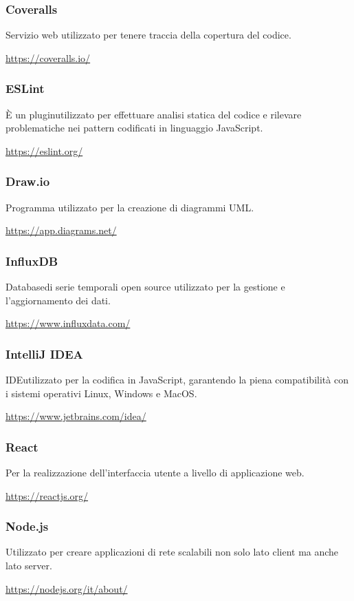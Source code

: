 	\subsubsection{Coveralls}
	Servizio web utilizzato per tenere traccia della copertura del codice.\\
	\centerline{\url{https://coveralls.io/}}
	\subsubsection{ESLint}
	È un plugin\glo utilizzato per effettuare analisi statica del codice e rilevare problematiche nei pattern codificati in linguaggio JavaScript\glo. \\
	\centerline{\url{https://eslint.org/}}
	\subsubsection{Draw.io}
	Programma utilizzato per la creazione di diagrammi UML.\\
	\centerline{\url{https://app.diagrams.net/}}
	\subsubsection{InfluxDB}
	Database\glo di serie temporali open source utilizzato per la gestione e l'aggiornamento dei dati.\\
	\centerline{\url{https://www.influxdata.com/}}
	\subsubsection{IntelliJ IDEA}
	IDE\glo utilizzato per la codifica in JavaScript, garantendo la piena compatibilità con i sistemi operativi Linux, Windows e MacOS.\\
	\centerline{\url{https://www.jetbrains.com/idea/}}
	\subsubsection{React}
	Per la realizzazione dell’interfaccia utente a livello di applicazione web.\\
	\centerline{\url{https://reactjs.org/}}
	\subsubsection{Node.js}
	Utilizzato per creare applicazioni di rete scalabili non solo lato client ma anche lato server.
	\\
	\centerline{\url{https://nodejs.org/it/about/}}
